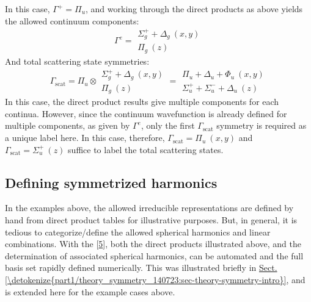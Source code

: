 \documentclass[letterpaper,table,10pt,english]{jupyterBook}
\begin{document}
\sphinxAtStartPar
In this case, \(\Gamma^{+} = \Pi_u\), and \sphinxhyphen{} working through the direct products as above \sphinxhyphen{} yields the allowed continuum components:
\label{equation:part2/sym-fitting-intro_240723:080852b1-c84e-4f36-8b54-543d08e79521}\begin{equation}
\Gamma^{e}=\begin{array}{c}
\Sigma_{g}^{+} + \Delta_{g}~(x,y)\\
\Pi_{g}~(z)
\end{array}
\end{equation}
\sphinxAtStartPar
And total scattering state symmetries:
\label{equation:part2/sym-fitting-intro_240723:17708185-cf02-4a20-8235-7e9da7063ab2}\begin{equation}
\Gamma_{\mathrm{scat}}=\Pi_{u}\otimes\begin{array}{c}
\Sigma_{g}^{+} + \Delta_{g}~(x,y)\\
\Pi_{g}~(z)
\end{array}=\begin{array}{c}
\Pi_{u} + \Delta_{u} + \Phi_{u}~(x,y)\\
\Sigma_{u}^{+} + \Sigma_{u}^{-} + \Delta_{u}~(z)
\end{array}
\end{equation}
\sphinxAtStartPar
In this case, the direct product results give multiple components for each continua. However, since the continuum wavefunction is already defined for multiple components, as given by \(\Gamma^{e}\), only the first \(\Gamma_{\mathrm{scat}}\) symmetry is required as a unique label here. In this case, therefore, \(\Gamma_{\mathrm{scat}} = \Pi_{u}~(x,y)\) and \(\Gamma_{\mathrm{scat}} =\Sigma_{u}^{+}~(z)\) suffice to label the total scattering states.


\subsection{Defining symmetrized harmonics}
\label{\detokenize{part2/sym-fitting-intro_240723:defining-symmetrized-harmonics}}
\sphinxAtStartPar
In the examples above, the allowed irreducible representations are defined by hand from direct product tables for illustrative purposes. But, in general, it is tedious to categorize/define the allowed spherical harmonics and linear combinations. With the  {[}\hyperlink{cite.backmatter/bibliography:id682}{5}{]}, both the direct products illustrated above, and the determination of associated spherical harmonics, can be automated and the full basis set rapidly defined numerically. This was illustrated briefly in \hyperref[\detokenize{part1/theory_symmetry_140723:sec-theory-symmetry-intro}]{Sect.\@ \ref{\detokenize{part1/theory_symmetry_140723:sec-theory-symmetry-intro}}}, and is extended here for the example cases above.
\end{document}

